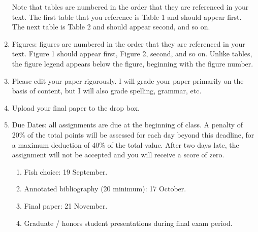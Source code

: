 \documentclass[12pt]{article}
\begin{document}
\begin{enumerate}
	\medskip
	Note that tables are numbered in the order that they are referenced in your text.  The first table that you reference is Table 1 and should appear first.  The next table is Table 2 and should appear second, and so on.
	
	\item Figures: figures are numbered in the order that they are referenced in your text.  Figure 1 should appear first, Figure 2, second, and so on.  Unlike tables, the figure legend appears below the figure, beginning with the figure number.  

	\item Please edit your paper rigorously. I will grade your paper primarily on the basis of content, but I will also grade spelling, grammar, etc.

	\item Upload your final paper to the drop box.  %

	\item Due Dates: all assignments are due at the beginning of class.  A penalty of 20\% of the total points will be assessed for each day beyond this deadline, for a maximum deduction of 40\% of the total value.  After two days late, the assignment will not be accepted and you will receive a score of zero.
	
	\begin{enumerate}[label=\alph*.]
		\item Fish choice: 19 September.
		\item Annotated bibliography (20 minimum): 17 October.
		\item Final paper: 21 November.
		\item Graduate / honors student presentations during final exam period.
	\end{enumerate}
\end{enumerate}
\end{document}
